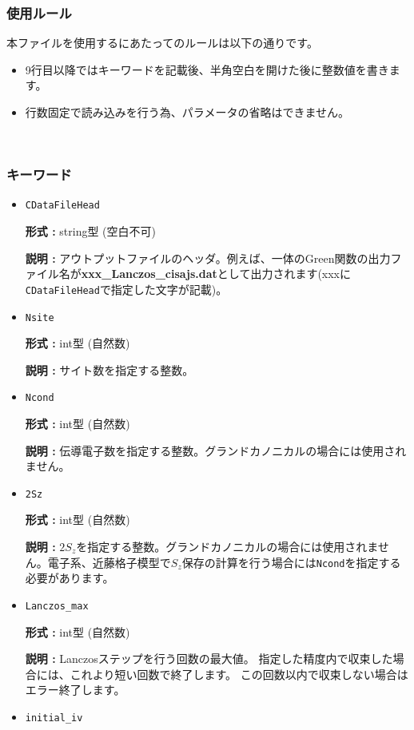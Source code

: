 \subsubsection{使用ルール}
本ファイルを使用するにあたってのルールは以下の通りです。
\begin{itemize}
\item 9行目以降ではキーワードを記載後、半角空白を開けた後に整数値を書きます。
\item 行数固定で読み込みを行う為、パラメータの省略はできません。
\end{itemize}

~\subsubsection{キーワード}
 \begin{itemize}
  \item  \verb|CDataFileHead|

 {\bf 形式 :} string型 (空白不可)

{\bf 説明 :} アウトプットファイルのヘッダ。例えば、一体のGreen関数の出力ファイル名が{\bf xxx\_Lanczos\_cisajs.dat}として出力されます(xxxに\verb|CDataFileHead|で指定した文字が記載)。
   
 \item  \verb|Nsite|

{\bf 形式 :} int型 (自然数)

{\bf 説明 :} サイト数を指定する整数。  

\item  \verb|Ncond|

{\bf 形式 :} {int型 (自然数)}

{\bf 説明 :} {伝導電子数を指定する整数。グランドカノニカルの場合には使用されません。}

 \item  \verb|2Sz|

{\bf 形式 :} {int型 (自然数)}

{\bf 説明 :} {$2S_z$を指定する整数。グランドカノニカルの場合には使用されません。電子系、近藤格子模型で$S_z$保存の計算を行う場合には}\verb|Ncond|を指定する必要があります。

 \item  \verb|Lanczos_max|

{\bf 形式 :} int型 (自然数)

{\bf 説明 :}  Lanczosステップを行う回数の最大値。
指定した精度内で収束した場合には、これより短い回数で終了します。
この回数以内で収束しない場合はエラー終了します。

 \item  \verb|initial_iv|


\end{itemize}
